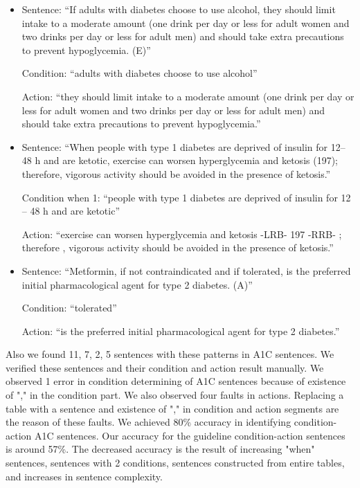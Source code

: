 \documentclass[12pt,letterpaper]{article}
\begin{document}
\begin{itemize}
\item Sentence: ``If adults with diabetes choose to use alcohol, they should limit intake to a moderate amount (one drink per day or less for adult women and two drinks per  day or less for  adult men) and should take extra precautions to prevent hypoglycemia. (E)''

Condition: ``adults with diabetes choose to use alcohol''

Action: ``they should limit intake to a moderate amount (one drink per day or less for adult women and two drinks per day or less for adult men) and should take extra precautions to prevent hypoglycemia.''

\item Sentence: ``When people with type 1 diabetes are deprived of insulin for 12– 48 h and are ketotic, exercise can worsen hyperglycemia and ketosis (197); therefore, vigorous activity should be avoided in the presence of ketosis.''

Condition when 1: ``people with type 1 diabetes are deprived of insulin for 12 -- 48 h and are ketotic''

Action: ``exercise can worsen hyperglycemia and ketosis -LRB- 197 -RRB- ; therefore , vigorous activity should be avoided in the presence of ketosis.''

\item Sentence: ``Metformin, if not contraindicated and if tolerated, is the preferred initial pharmacological agent for type 2 diabetes. (A)''

Condition: ``tolerated''

Action: ``is the preferred initial pharmacological agent for type 2 diabetes.''
\end{itemize}

Also we found 11, 7, 2, 5 sentences with these patterns in A1C sentences. We verified these sentences and their condition and action result manually. We observed 1 error in condition determining of A1C sentences because of existence of "," in the condition part. We also observed four faults in actions. Replacing a table with a sentence and existence of "," in condition and action segments are the reason of these faults. We achieved 80\% accuracy in identifying condition-action A1C sentences. Our accuracy for the guideline condition-action sentences is around 57\%. The decreased accuracy is the result of increasing "when" sentences, sentences with 2 conditions, sentences constructed from entire tables, and increases in sentence complexity.
\end{document}
